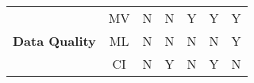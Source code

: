 \begin{table}[]
{\begin{tabular}{ccccccc}
\multicolumn{1}{|c|}{\multirow{3}{*}{\textbf{Data Quality}}}                                                      & \multicolumn{1}{c|}{MV} & \multicolumn{1}{c|}{N}                                                                                                     & \multicolumn{1}{c|}{N}                                                                                                                  & \multicolumn{1}{c|}{Y}                                                                                                & \multicolumn{1}{c|}{Y}                                                                                                              & \multicolumn{1}{c|}{Y}                                                                                                              \\ \cline{2-7} 
\multicolumn{1}{|c|}{}                                                                                   & \multicolumn{1}{c|}{ML} & \multicolumn{1}{c|}{N}                                                                                                     & \multicolumn{1}{c|}{N}                                                                                                                  & \multicolumn{1}{c|}{N}                                                                                                & \multicolumn{1}{c|}{N}                                                                                                              & \multicolumn{1}{c|}{Y}                                                                                                              \\ \cline{2-7} 
\multicolumn{1}{|c|}{}                                                                                   & \multicolumn{1}{c|}{CI} & \multicolumn{1}{c|}{N}                                                                                                     & \multicolumn{1}{c|}{Y}                                                                                                                  & \multicolumn{1}{c|}{N}                                                                                                & \multicolumn{1}{c|}{Y}                                                                                                              & \multicolumn{1}{c|}{N}                                                                                                              \\ \hline

\end{tabular}}
\end{table}
